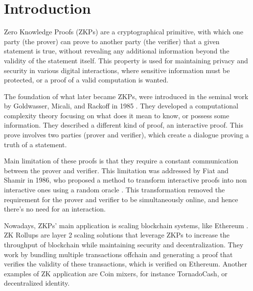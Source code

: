 \chapter{Introduction}

Zero Knowledge Proofs (ZKPs) are a cryptographical primitive, with which one
party (the prover) can prove to another party (the verifier) that a given
statement is true, without revealing any additional information beyond the
validity of the statement itself. This property is
used for maintaining privacy and security in various digital interactions,
where sensitive information must be protected, or a proof of a valid computation
is wanted. \cite{Goldreich1991}

The foundation of what later became ZKPs, were introduced in the seminal work
by Goldwasser, Micali, and Rackoff in 1985 \cite{Goldwasser1989}.
They developed a computational complexity theory focusing on what does it mean
to know, or possess some information. They described a different kind of proof,
an interactive proof. This prove involves two parties (prover and verifier),
which create a dialogue proving a truth of a statement. \cite{Goldwasser1986}

Main limitation of these proofs is that they require a constant communication
between the prover and verifier. This limitation was addressed by Fiat and
Shamir in 1986, who proposed a  method to transform interactive proofs into
non interactive ones using a random oracle \cite{Fiat1986}. This transformation
removed the requirement for the prover and verifier to be simultaneously online,
and hence there's no need for an interaction.

Nowadays, ZKPs' main application is scaling blockchain systems, like Ethereum
\cite{Ethereum}. ZK Rollups are layer 2 scaling solutions that leverage ZKPs
to increase the throughput of blockchain while maintaining security
and decentralization. They work by bundling multiple transactions offchain
and generating a proof that verifies the validity of these transactions,
which is verified on Ethereum. Another examples of ZK application are Coin
mixers, for instance TornadoCash, or decentralized identity.

